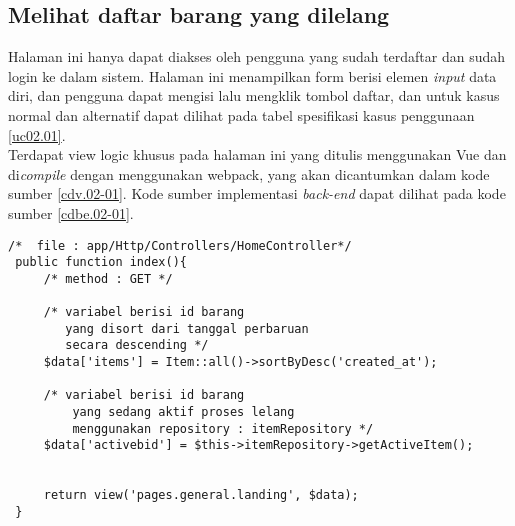 \subsection{Melihat daftar barang yang dilelang}
Halaman ini hanya dapat diakses oleh pengguna yang sudah terdaftar dan sudah login ke dalam sistem. Halaman ini menampilkan form berisi elemen \textit{input} data diri, dan pengguna dapat mengisi lalu mengklik tombol daftar, dan untuk kasus normal dan alternatif dapat dilihat pada tabel spesifikasi kasus penggunaan \ref{uc02.01}.\\
\indent Terdapat view logic khusus pada halaman ini yang ditulis menggunakan Vue dan di\textit{compile} dengan menggunakan webpack, yang akan dicantumkan dalam kode sumber \ref{cdv.02-01}. Kode sumber implementasi \textit{back-end} dapat dilihat pada kode sumber \ref{cdbe.02-01}.

\begin{lstlisting}[label=cdbe.02-01,style=php,caption=Kode Sumber \textit{Back-end} Melihat Daftar Barang]
/*	file : app/Http/Controllers/HomeController*/
 public function index(){
	 /*	method : GET */
	 
	 /*	variabel berisi id barang 
		yang disort dari tanggal perbaruan
		secara descending */
	 $data['items'] = Item::all()->sortByDesc('created_at');
	 
	 /*	variabel berisi id barang 
		 yang sedang aktif proses lelang
		 menggunakan repository : itemRepository */
	 $data['activebid'] = $this->itemRepository->getActiveItem();
	 

	 return view('pages.general.landing', $data);
 }
\end{lstlisting}

